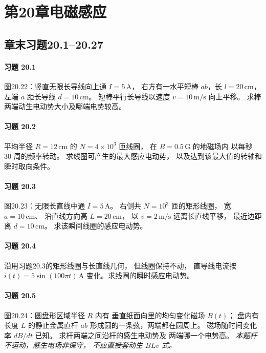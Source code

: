 \section*{第20章\quad 电磁感应}
\subsection*{章末习题20.1--20.27}

\paragraph{习题 20.1}
图20.22：竖直无限长导线向上通 \(I=5\,\mathrm A\)，
右方有一水平短棒 \(ab\)，长 \(l=20\,\mathrm{cm}\)，
左端 \(a\) 距长导线 \(d=10\,\mathrm{cm}\)。
短棒平行长导线以速度
\(v=10\,\mathrm{m/s}\) 向上平移。
求棒两端动生电动势大小及哪端电势较高。

\paragraph{习题 20.2}
平均半径 \(R=12\,\mathrm{cm}\) 的
\(N=4\times10^3\) 匝线圈，
在 \(B=0.5\,\mathrm G\) 的地磁场内
以每秒 \(30\) 周的频率转动。
求线圈可产生的最大感应电动势，
以及达到该最大值的转轴和瞬时取向条件。

\paragraph{习题 20.3}
图20.23：无限长直线中通 \(I=5\,\mathrm A\)。
右侧共 \(N=10^3\) 匝的矩形线圈，
宽 \(a=10\,\mathrm{cm}\)、
沿直线方向高 \(L=20\,\mathrm{cm}\)，
以 \(v=2\,\mathrm{m/s}\) 远离长直线平移，
最近边距离 \(d=10\,\mathrm{cm}\)。
求该瞬间线圈的感应电动势。

\paragraph{习题 20.4}
沿用习题20.3的矩形线圈与长直线几何，
但线圈保持不动，
直导线电流按
\(i(t)=5\sin(100\pi t)\,\mathrm A\)
变化。求线圈的瞬时感应电动势。

\paragraph{习题 20.5}
图20.24：圆盘形区域半径 \(R\) 内有
垂直纸面向里的均匀变化磁场 \(B(t)\)；
盘内有长度 \(L\) 的静止金属直杆
\(ab\) 形成圆的一条弦，两端都在圆周上。
磁场随时间变化率 \(dB/dt\) 已知。
求杆两端之间沿杆的感生电动势及
两端哪一个电势高。
\textit{本题杆不运动，感生电场非保守，
不应直接套动生 \(B Lv\) 式。}

